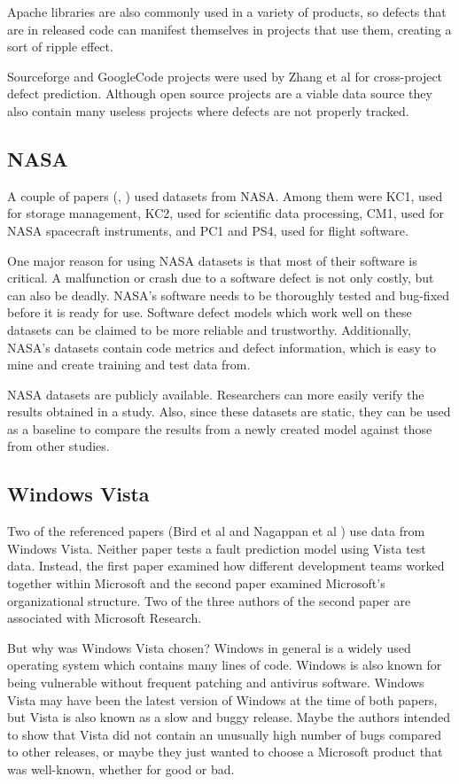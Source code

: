 \documentclass{sig-alternate-05-2015}
\begin{document}
Apache libraries are also commonly used in a variety of products, so defects that are in released code can manifest themselves in projects that use them, creating a sort of ripple effect.

Sourceforge and GoogleCode projects were used by Zhang et al \cite{Zhang2014} for cross-project defect prediction. Although open source projects are a viable data source they also contain many useless projects where defects are not properly tracked.

\subsection{NASA}
A couple of papers (\cite{zheng2010}, \cite{Vandecruys}) used datasets from NASA. Among them were KC1, used for storage management, KC2, used for scientific data processing, CM1, used for NASA spacecraft instruments, and PC1 and PS4, used for flight software.

One major reason for using NASA datasets is that most of their software is critical. A malfunction or crash due to a software defect is not only costly, but can also be deadly. NASA's software needs to be thoroughly tested and bug-fixed before it is ready for use. Software defect models which work well on these datasets can be claimed to be more reliable and trustworthy. Additionally, NASA's datasets contain code metrics and defect information, which is easy to mine and create training and test data from.

NASA datasets are publicly available. Researchers can more easily verify the results obtained in a study. Also, since these datasets are static, they can be used as a baseline to compare the results from a newly created model against those from other studies.
\subsection{Windows Vista}
Two of the referenced papers (Bird et al \cite{Bird} and Nagappan et al \cite{Nagappan}) use data from Windows Vista. Neither paper tests a fault prediction model using Vista test data. Instead, the first paper examined how different development teams worked together within Microsoft and the second paper examined Microsoft's organizational structure. Two of the three authors of the second paper are associated with Microsoft Research. 

But why was Windows Vista chosen? Windows in general is a widely used operating system which contains many lines of code. Windows is also known for being vulnerable without frequent patching and antivirus software. Windows Vista may have been the latest version of Windows at the time of both papers, but Vista is also known as a slow and buggy release. Maybe the authors intended to show that Vista did not contain an unusually high number of bugs compared to other releases, or maybe they just wanted to choose a Microsoft product that was well-known, whether for good or bad.
\end{document}
